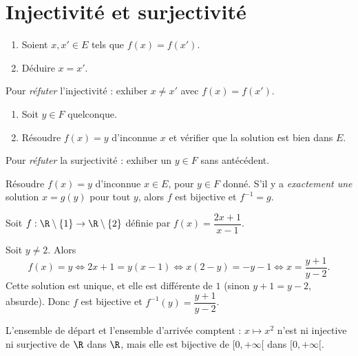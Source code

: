 
\section{Injectivité et surjectivité}

\begin{methode}
\begin{enumerate}[label=\textbf{Étape \arabic*.}]
  \item Soient $x,x'\in E$ tels que $f(x)=f(x')$.
  \item Déduire $x=x'$.
\end{enumerate}
Pour \emph{réfuter} l'injectivité : exhiber $x\ne x'$ avec $f(x)=f(x')$.
\end{methode}

\begin{methode}
\begin{enumerate}[label=\textbf{Étape \arabic*.}]
  \item Soit $y\in F$ quelconque.
  \item Résoudre $f(x)=y$ d'inconnue $x$ et vérifier que la solution est bien dans $E$.
\end{enumerate}
Pour \emph{réfuter} la surjectivité : exhiber un $y\in F$ sans antécédent.
\end{methode}

\begin{methode}
Résoudre $f(x)=y$ d'inconnue $x\in E$, pour $y\in F$ donné. S'il y a \emph{exactement une} solution $x=g(y)$ pour tout $y$, alors $f$ est bijective et $f^{-1}=g$.
\end{methode}

\begin{exemple}
Soit $f:\R\setminus\{1\}\to\R\setminus\{2\}$ définie par $f(x)=\dfrac{2x+1}{x-1}$.

Soit $y\neq2$. Alors
\[
  f(x)=y \iff 2x+1=y(x-1) \iff x(2-y)=-y-1 \iff x=\frac{y+1}{y-2}.
\]
Cette solution est unique, et elle est différente de $1$ (sinon $y+1=y-2$, absurde). Donc $f$ est bijective et $f^{-1}(y)=\dfrac{y+1}{y-2}$.
\end{exemple}

\begin{attention}
L'ensemble de départ et l'ensemble d'arrivée comptent : $x\mapsto x^2$ n'est ni injective ni surjective de $\R$ dans $\R$, mais elle est bijective de $[0,+\infty[$ dans $[0,+\infty[$.
\end{attention}

